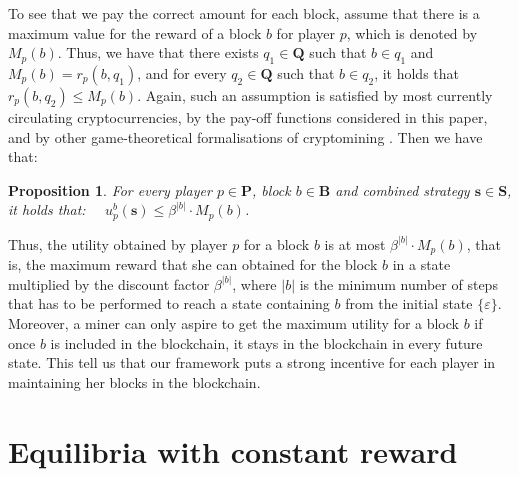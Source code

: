 \documentclass[a4paper,english,cleveref, autoref,numberwithinsect]{lipics-v2019}
\newtheorem{myprop}[mythm]{Proposition}
\newcommand{\bs}{\mathbf{s}}
\newcommand{\bP}{\mathbf{P}}
\newcommand{\bB}{\mathbf{B}}
\newcommand{\bS}{\mathbf{S}}
\newcommand{\bQ}{\mathbf{Q}}
\begin{document}
To see that we pay the correct amount for each block, assume that there is a maximum value for the reward of a block $b$ for player $p$, which is denoted by $M_p(b)$. Thus, we have that there exists $q_1 \in \bQ$ such that $b \in q_1$ and $M_p(b) = r_p(b,q_1)$, and for every $q_2 \in \bQ$ such that $b \in q_2$, it holds that $r_p(b,q_2) \leq M_p(b)$. Again, such an assumption is satisfied by most currently circulating cryptocurrencies, by the pay-off functions considered in this paper, and by other game-theoretical formalisations of cryptomining \cite{mininggames:2016,koutsoupias2018blockchain}. Then we have that:
\begin{myprop}\label{prop-ub-block}
For every player $p \in \bP$, block $b \in \bB$ and combined strategy $\bs \in \bS$, it holds that: \ \ $u^b_p(\bs)  \leq   \beta^{|b|} \cdot M_p(b)$.
\end{myprop}
Thus, the utility obtained by player $p$ for a block $b$ is at most $\beta^{|b|} \cdot M_p(b)$, that is, the maximum reward that she can obtained for the block $b$ in a state multiplied by the discount factor $\beta^{|b|}$, where $|b|$ is the minimum number of steps that has to be performed to reach a state containing $b$ from the initial state $\{\varepsilon\}$. 
Moreover, a miner can only aspire to get the maximum utility for a block $b$ if once $b$ is included in the blockchain, it stays in the blockchain in every future state. This tell us that our framework puts a strong incentive for each player in maintaining her blocks in the blockchain.





\section{Equilibria %
with constant reward}
\label{sec-const_rew}
\end{document}
